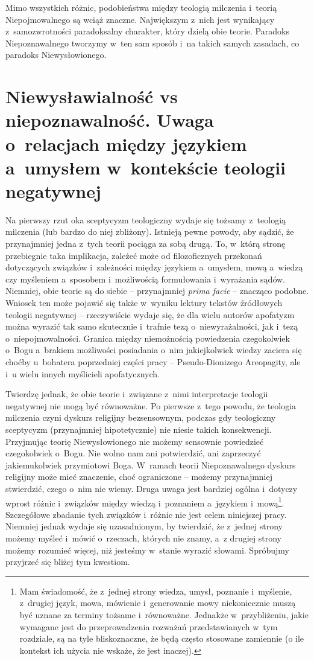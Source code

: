Mimo wszystkich różnic, podobieństwa między teologią milczenia i~teorią Niepojmowalnego są wciąż znaczne. Największym z~nich jest wynikający z~samozwrotności paradoksalny charakter, który dzielą obie teorie. Paradoks Niepoznawalnego tworzymy w~ten sam sposób i~na takich samych zasadach, co paradoks Niewysłowionego.


\section{Niewysławialność vs niepoznawalność. Uwaga o~relacjach między językiem a~umysłem w~kontekście teologii negatywnej}\label{scep-werapo}

Na pierwszy rzut oka sceptycyzm teologiczny wydaje się tożsamy z~teologią milczenia (lub bardzo do niej zbliżony). Istnieją pewne powody, aby sądzić, że przynajmniej jedna z~tych teorii pociąga za sobą drugą. To, w~którą stronę przebiegnie taka implikacja, zależeć może od filozoficznych przekonań dotyczących związków i~zależności między językiem a~umysłem, mową a~wiedzą czy myśleniem a~sposobem i~możliwością formułowania i~wyrażania sądów. Niemniej, obie teorie są do siebie -- przynajmniej \textit{prima facie} -- znacząco podobne. Wniosek ten może pojawić się także w~wyniku lektury tekstów źródłowych teologii negatywnej -- rzeczywiście wydaje się, że dla wielu autorów apofatyzm można wyrazić tak samo skutecznie i~trafnie tezą o~niewyrażalności, jak i~tezą o~niepojmowalności. Granica między niemożnością powiedzenia czegokolwiek o~Bogu a~brakiem możliwości posiadania o~nim jakiejkolwiek wiedzy zaciera się choćby u~bohatera poprzedniej części pracy -- Pseudo-Dionizego Areopagity, ale i~u wielu innych myślicieli apofatycznych.

Twierdzę jednak, że obie teorie i~związane z~nimi interpretacje teologii negatywnej nie mogą być równoważne. Po pierwsze z~tego powodu, że teologia milczenia czyni dyskurs religijny bezsensownym, podczas gdy teologiczny sceptycyzm (przynajmniej hipotetycznie) nie niesie takich konsekwencji. Przyjmując teorię Niewysłowionego nie możemy sensownie powiedzieć czegokolwiek o~Bogu. Nie wolno nam ani potwierdzić, ani zaprzeczyć jakiemukolwiek przymiotowi Boga. W~ramach teorii Niepoznawalnego dyskurs religijny może mieć znaczenie, choć ograniczone -- możemy przynajmniej stwierdzić, czego o~nim nie wiemy. Druga uwaga jest bardziej ogólna i~dotyczy wprost różnic i~związków między wiedzą i~poznaniem a~językiem i~mową\footnote{Mam świadomość, że z~jednej strony wiedza, umysł, poznanie i~myślenie, z~drugiej język, mowa, mówienie i~generowanie mowy niekoniecznie muszą być uznane za terminy tożsame i~równoważne. Jednakże w~przybliżeniu, jakie wymagane jest do przeprowadzenia rozważań przedstawianych w~tym rozdziale, są na tyle bliskoznaczne, że będą często stosowane zamiennie (o ile kontekst ich użycia nie wskaże, że jest inaczej).}. Szczegółowe zbadanie tych związków i~różnic nie jest celem niniejszej pracy. Niemniej jednak wydaje się uzasadnionym, by twierdzić, że z~jednej strony możemy myśleć i~mówić o~rzeczach, których nie znamy, a~z drugiej strony możemy rozumieć więcej, niż jesteśmy w~stanie wyrazić słowami. Spróbujmy przyjrzeć się bliżej tym kwestiom.

